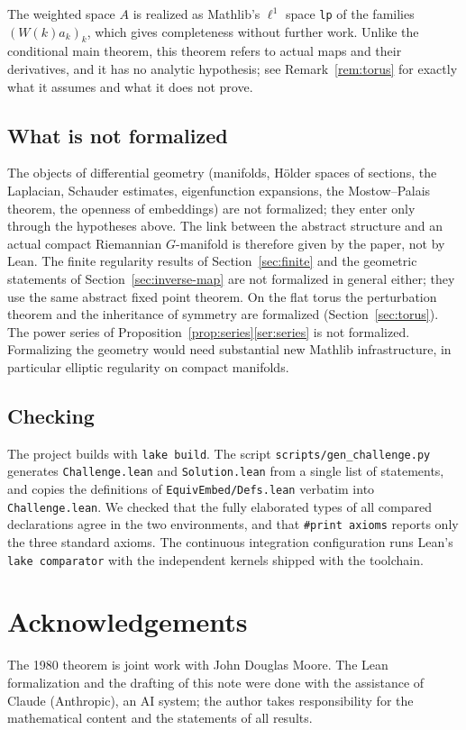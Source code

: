 \documentclass[11pt]{amsart}
\theoremstyle{definition}
\begin{document}
The weighted space $A$ is realized as Mathlib's $\ell^1$ space \texttt{lp} of the families
$(W(k)a_k)_k$, which gives completeness without further work. Unlike the conditional main theorem,
this theorem refers to actual maps and their derivatives, and it has no analytic hypothesis; see
Remark~\ref{rem:torus} for exactly what it assumes and what it does not prove.

\subsection{What is not formalized}
The objects of differential geometry (manifolds, H\"older spaces of sections, the Laplacian,
Schauder estimates, eigenfunction expansions, the Mostow--Palais theorem, the openness of
embeddings) are not formalized; they enter only through the hypotheses above. The link between the
abstract structure and an actual compact Riemannian $G$-manifold is therefore given by the paper,
not by Lean. The finite regularity results of Section~\ref{sec:finite} and the
geometric statements of Section~\ref{sec:inverse-map} are not formalized in general either; they
use the same abstract fixed point theorem. On the flat torus the perturbation theorem and the
inheritance of symmetry are formalized (Section~\ref{sec:torus}). The power series of
Proposition~\ref{prop:series}\ref{ser:series} is not formalized. Formalizing the geometry would need substantial new Mathlib infrastructure, in particular
elliptic regularity on compact manifolds.

\subsection{Checking}
The project builds with \texttt{lake build}. The script \texttt{scripts/gen\_challenge.py}
generates \texttt{Challenge.lean} and \texttt{Solution.lean} from a single list of statements, and
copies the definitions of \texttt{EquivEmbed/Defs.lean} verbatim into \texttt{Challenge.lean}. We
checked that the fully elaborated types of all compared declarations agree in the two environments,
and that \texttt{\#print axioms} reports only the three standard axioms. The continuous integration
configuration runs Lean's \texttt{lake comparator} with the independent kernels shipped with the
toolchain.

\section*{Acknowledgements}
The 1980 theorem is joint work with John Douglas Moore. The Lean formalization and the drafting of
this note were done with the assistance of Claude (Anthropic), an AI system; the author takes
responsibility for the mathematical content and the statements of all results.
\end{document}
